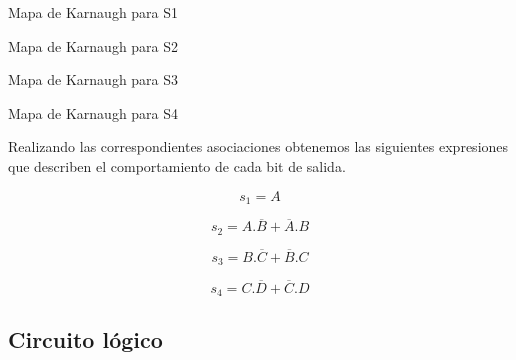 \begin{center}

    \begin{Karnaugh}\label{Karnaugh_s1}
    \end{Karnaugh}
    
Mapa de Karnaugh para S1

\begin{Karnaugh}\label{Karnaugh_s2}
    \end{Karnaugh}
    
Mapa de Karnaugh para S2

\begin{Karnaugh}\label{Karnaugh_s4}
     \end{Karnaugh}
    
Mapa de Karnaugh para S3

\begin{Karnaugh}\label{Karnaugh_s4}
    \end{Karnaugh}

Mapa de Karnaugh para S4    
\end{center} 
Realizando las correspondientes asociaciones obtenemos las siguientes expresiones que describen el comportamiento de cada bit de salida.

\begin{equation}\label{s1_Karnaugh}
    s_{1}= A
\end{equation}

\begin{equation}\label{s2_Karnaugh}
    s_{2}= A.\overline{B}+\overline{A}.B
\end{equation}

\begin{equation}\label{s3_Karnaugh}
    s_{3}= B.\overline{C}+\overline{B}.C
\end{equation}

\begin{equation}\label{s4_Karnaugh}
    s_{4}= C.\overline{D}+\overline{C}.D
\end{equation}

\subsection{Circuito l\'ogico}\label{ej2_circ}

